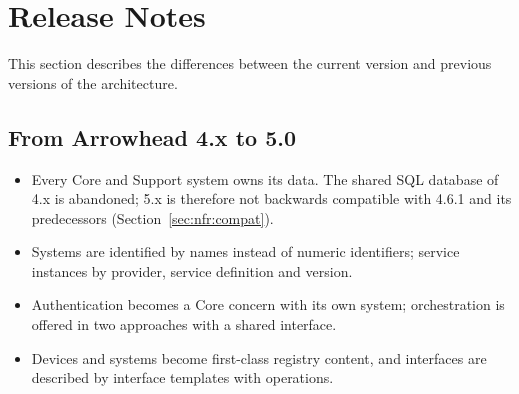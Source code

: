 \documentclass[a4paper]{arrowhead}
\begin{document}
\section{Release Notes}
\label{sec:release}

This section describes the differences between the current version and previous versions of the
architecture.

\subsection{From Arrowhead 4.x to 5.0}
\begin{itemize}
  \item Every Core and Support system owns its data. The shared SQL database of 4.x is
        abandoned; 5.x is therefore not backwards compatible with 4.6.1 and its predecessors
        (Section~\ref{sec:nfr:compat}).
  \item Systems are identified by names instead of numeric identifiers; service instances by
        provider, service definition and version.
  \item Authentication becomes a Core concern with its own system; orchestration is offered in
        two approaches with a shared interface.
  \item Devices and systems become first-class registry content, and interfaces are described by
        interface templates with operations.
\end{itemize}
\end{document}
